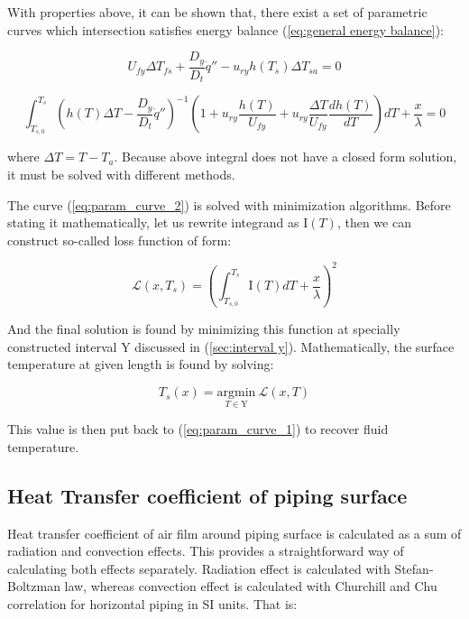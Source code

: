 \documentclass[10pt, letterpaper]{article}
\begin{document}
	With properties above, it can be shown that, there exist a set of parametric curves which intersection satisfies energy balance (\ref{eq:general energy balance}):

	\begin{equation}
		U_{fy} \Delta{T_{fs}} + \frac{D_{y}}{D_{t}} \dot{q}'' - u_{ry} h(T_{s}) \Delta{T_{sa}} = 0
		\label{eq:param_curve_1}
	\end{equation}

	\begin{equation}
		\int_{T_{s,0}}^{T_{s}}
		\left( 
		h(T) \Delta{T} - \frac{D_{y}}{D_{t}} \dot{q}''
		\right)^{-1}
		\left( 
		1 + u_{ry} \frac{h(T)}{U_{fy}} + u_{ry} \frac{\Delta{T}}{U_{fy}}
		\frac{dh(T)}{dT}
		\right)
		dT
		+ \frac{x}{\lambda} = 0
		\label{eq:param_curve_2}
	\end{equation}

	\noindent where $\Delta{T} = T - T_{a}$. Because above integral does not have a closed form solution, it must be solved with different methods. 

	The curve (\ref{eq:param_curve_2}) is solved with minimization algorithms. Before stating it mathematically, let us rewrite integrand as $\text{I}(T)$, then we can construct so-called loss function of form:

	\begin{equation*}
		\mathcal{L}(x, T_{s}) = \left( \int_{T_{s,0}}^{T_{s}} \text{I}(T) dT + \frac{x}{\lambda} \right)^{2}
		\label{eq:loss_func_def}
	\end{equation*}

	And the final solution is found by minimizing this function at specially constructed interval $\text{Y}$ discussed in (\ref{sec:interval y}). Mathematically, the surface temperature at given length is found by solving:

	\begin{equation}
		T_{s}(x) = \underset{T \in \text{Y}}{\text{argmin}} \ \mathcal{L}(x, T)
		\label{eq:T_s_solution}
	\end{equation}

	\noindent This value is then put back to (\ref{eq:param_curve_1}) to recover fluid temperature.

	\subsection{Heat Transfer coefficient of piping surface}
	Heat transfer coefficient of air film around piping surface is calculated as a sum of radiation and convection effects. This provides a straightforward way of calculating both effects separately. Radiation effect is calculated with Stefan-Boltzman law, whereas convection effect is calculated with Churchill and Chu correlation for horizontal piping in SI units. That is:
\end{document}
